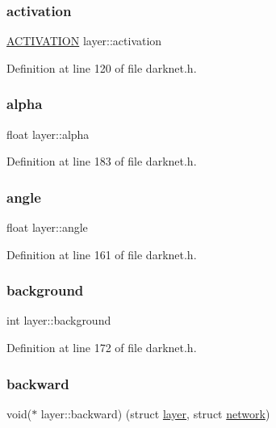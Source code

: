 \subsubsection{\texorpdfstring{activation}{activation}}
{\footnotesize\ttfamily \mbox{\hyperlink{darknet_8h_aea09b678fab8ab931902378cbbd79032}{A\+C\+T\+I\+V\+A\+T\+I\+ON}} layer\+::activation}



Definition at line 120 of file darknet.\+h.

\mbox{\label{structlayer_aa9495e20d42d431aa52dd4eedb03e8b5}} 
\subsubsection{\texorpdfstring{alpha}{alpha}}
{\footnotesize\ttfamily float layer\+::alpha}



Definition at line 183 of file darknet.\+h.

\mbox{\label{structlayer_ad484c9f3947a86cd9c328811c1d0b24f}} 
\subsubsection{\texorpdfstring{angle}{angle}}
{\footnotesize\ttfamily float layer\+::angle}



Definition at line 161 of file darknet.\+h.

\mbox{\label{structlayer_a509601d552c5e188902dc7cfddfe6ee4}} 
\subsubsection{\texorpdfstring{background}{background}}
{\footnotesize\ttfamily int layer\+::background}



Definition at line 172 of file darknet.\+h.

\mbox{\label{structlayer_a97391cfa71ea05cd917a3919f00e14a6}} 
\subsubsection{\texorpdfstring{backward}{backward}}
{\footnotesize\ttfamily void($\ast$ layer\+::backward) (struct \mbox{\hyperlink{structlayer}{layer}}, struct \mbox{\hyperlink{structnetwork}{network}})}



